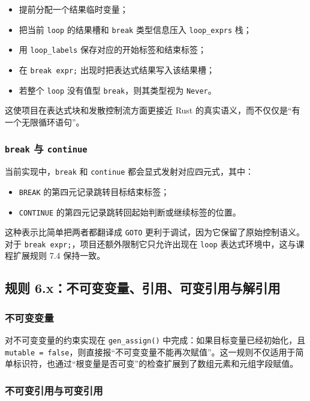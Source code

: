 \documentclass[UTF8,a4paper,12pt]{ctexart}
\newcommand{\pkg}[1]{\texttt{#1}}
\newcommand{\op}[1]{\texttt{#1}}
\begin{document}
\begin{itemize}
    \item 提前分配一个结果临时变量；
    \item 把当前 \pkg{loop} 的结果槽和 \pkg{break} 类型信息压入 \pkg{loop\_exprs} 栈；
    \item 用 \pkg{loop\_labels} 保存对应的开始标签和结束标签；
    \item 在 \pkg{break expr;} 出现时把表达式结果写入该结果槽；
    \item 若整个 \pkg{loop} 没有值型 \pkg{break}，则其类型视为 \pkg{Never}。
\end{itemize}

这使项目在表达式块和发散控制流方面更接近 Rust 的真实语义，而不仅仅是“有一个无限循环语句”。

\subsubsection{\pkg{break} 与 \pkg{continue}}

当前实现中，\pkg{break} 和 \pkg{continue} 都会显式发射对应四元式，其中：

\begin{itemize}
    \item \op{BREAK} 的第四元记录跳转目标结束标签；
    \item \op{CONTINUE} 的第四元记录跳转回起始判断或继续标签的位置。
\end{itemize}

这种表示比简单把两者都翻译成 \op{GOTO} 更利于调试，因为它保留了原始控制语义。对于 \pkg{break expr;}，项目还额外限制它只允许出现在 \pkg{loop} 表达式环境中，这与课程扩展规则 7.4 保持一致。

\subsection{规则 6.x：不可变变量、引用、可变引用与解引用}

\subsubsection{不可变变量}

对不可变变量的约束实现在 \pkg{gen\_assign()} 中完成：如果目标变量已经初始化，且 \pkg{mutable = false}，则直接报“不可变变量不能再次赋值”。这一规则不仅适用于简单标识符，也通过“根变量是否可变”的检查扩展到了数组元素和元组字段赋值。

\subsubsection{不可变引用与可变引用}
\end{document}
